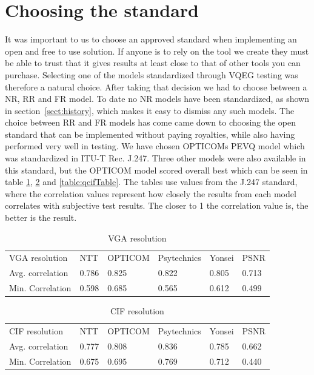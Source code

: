 \section{Choosing the standard}\label{sect:cts}

It was important to us to choose an approved standard when implementing an open and free to use solution. If anyone is to rely on the tool we create they must be able to trust that it gives results at least close to that of other tools you can purchase. Selecting one of the models standardized through VQEG testing was therefore a natural choice. After taking that decision we had to choose between a NR, RR and FR model. To date no NR models have been standardized, as shown in section~\ref{sect:history}, which makes it easy to dismiss any such models. The choice between RR and FR models has come came down to choosing the open standard that can be implemented without paying royalties, while also having performed very well in testing. We have chosen OPTICOMs PEVQ model which was standardized in ITU-T Rec. J.247\cite{j.247}. Three other models were also available in this standard, but the OPTICOM model scored overall best which can be seen in table \ref{table:vgaTable}, \ref{table:cifTable} and \ref{table:qcifTable}. The tables use values from the J.247 standard, where the correlation values represent how closely the results from each model correlates with subjective test results. The closer to 1 the correlation value is, the better is the result.


\begin{table}[h]
    \center
    \caption{VGA resolution}
    \begin{tabular}{llllll}
    VGA resolution   & NTT   & OPTICOM & Psytechnics & Yonsei & PSNR  \\
    Avg. correlation & 0.786 & 0.825   & 0.822       & 0.805  & 0.713 \\
    Min. Correlation & 0.598 & 0.685   & 0.565       & 0.612  & 0.499 \\
    \end{tabular}  
     \label{table:vgaTable}
\end{table}

\begin{table}[h]
    \center
    \caption{CIF resolution}
    \begin{tabular}{llllll}
    CIF resolution   & NTT   & OPTICOM & Psytechnics & Yonsei & PSNR  \\
    Avg. correlation & 0.777 & 0.808   & 0.836       & 0.785  & 0.662 \\
    Min. Correlation & 0.675 & 0.695   & 0.769       & 0.712  & 0.440 \\
    \end{tabular}
    \label{table:cifTable}
\end{table}

